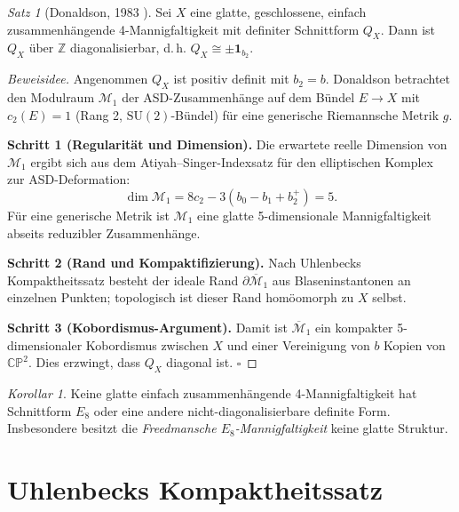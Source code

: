 \documentclass[12pt,a4paper]{amsart}
\theoremstyle{definition}
\theoremstyle{remark}
\newtheorem{satz}[theorem]{Satz}
\newtheorem{korollar}[theorem]{Korollar}
\newcommand{\CP}{\mathbb{CP}}
\newcommand{\ZZ}{\mathbb{Z}}
\begin{document}
\begin{satz}[Donaldson, 1983 \cite{Donaldson1983}]
Sei $X$ eine glatte, geschlossene, einfach zusammenhängende 4-Mannigfaltigkeit
mit definiter Schnittform $Q_X$.  Dann ist $Q_X$ über $\ZZ$ diagonalisierbar,
d.\,h. $Q_X \cong \pm \mathbf{1}_{b_2}$.
\end{satz}

\begin{proof}[Beweisidee]
Angenommen $Q_X$ ist positiv definit mit $b_2 = b$.  Donaldson betrachtet
den Modulraum $\mathcal{M}_1$ der ASD-Zusammenhänge auf dem Bündel
$E \to X$ mit $c_2(E) = 1$ (Rang 2, $\mathrm{SU}(2)$-Bündel) für eine
generische Riemannsche Metrik $g$.

\medskip
\noindent\textbf{Schritt 1 (Regularität und Dimension).}
Die erwartete reelle Dimension von $\mathcal{M}_1$ ergibt sich aus dem
Atiyah--Singer-Indexsatz für den elliptischen Komplex zur ASD-Deformation:
\[
  \dim \mathcal{M}_1 = 8c_2 - 3(b_0 - b_1 + b_2^+) = 5.
\]
Für eine generische Metrik ist $\mathcal{M}_1$ eine glatte 5-dimensionale
Mannigfaltigkeit abseits reduzibler Zusammenhänge.

\medskip
\noindent\textbf{Schritt 2 (Rand und Kompaktifizierung).}
Nach Uhlenbecks Kompaktheitssatz \cite{Uhlenbeck1982} besteht der ideale
Rand $\partial\overline{\mathcal{M}}_1$ aus Blaseninstantonen an einzelnen
Punkten; topologisch ist dieser Rand homöomorph zu $X$ selbst.

\medskip
\noindent\textbf{Schritt 3 (Kobordismus-Argument).}
Damit ist $\overline{\mathcal{M}}_1$ ein kompakter 5-dimensionaler Kobordismus
zwischen $X$ und einer Vereinigung von $b$ Kopien von $\CP^2$.  Dies erzwingt,
dass $Q_X$ diagonal ist. $\square$
\end{proof}

\begin{korollar}
Keine glatte einfach zusammenhängende 4-Mannigfaltigkeit hat Schnittform $E_8$
oder eine andere nicht-diagonalisierbare definite Form.  Insbesondere besitzt
die \emph{Freedmansche $E_8$-Mannigfaltigkeit} keine glatte Struktur.
\end{korollar}

\section{Uhlenbecks Kompaktheitssatz}
\end{document}

